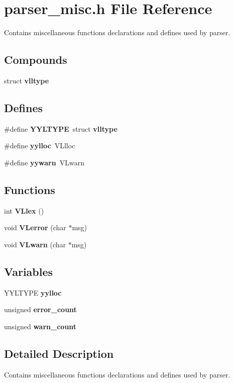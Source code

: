 \section{parser\_\-misc.h File Reference}
\label{parser__misc_8h}
Contains miscellaneous functions declarations and defines used by parser. 


\subsection*{Compounds}
\begin{CompactItemize}
\item 
struct {\bf vlltype}
\end{CompactItemize}
\subsection*{Defines}
\begin{CompactItemize}
\item 
\#define {\bf YYLTYPE}\ struct {\bf vlltype}
\item 
\#define {\bf yylloc}\ VLlloc
\item 
\#define {\bf yywarn}\ VLwarn
\end{CompactItemize}
\subsection*{Functions}
\begin{CompactItemize}
\item 
int {\bf VLlex} ()
\item 
void {\bf VLerror} (char $\ast$msg)
\item 
void {\bf VLwarn} (char $\ast$msg)
\end{CompactItemize}
\subsection*{Variables}
\begin{CompactItemize}
\item 
YYLTYPE {\bf yylloc}
\item 
unsigned {\bf error\_\-count}
\item 
unsigned {\bf warn\_\-count}
\end{CompactItemize}


\subsection{Detailed Description}
Contains miscellaneous functions declarations and defines used by parser.

